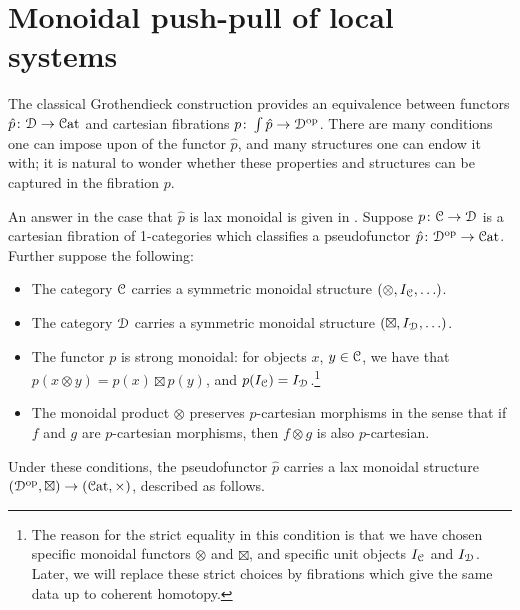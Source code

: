 \documentclass[main.tex]{subfiles}
\begin{document}
\section{Monoidal push-pull of local systems}
\label{sec:the_monoidal_construction}

The classical Grothendieck construction provides an equivalence between functors $\hat{p}\colon \mathcal{D} \to \mathcal{C}\mathrm{at}$ and cartesian fibrations $p\colon \int \hat{p} \to \mathcal{D}^{\mathrm{op}}$. There are many conditions one can impose upon of the functor $\hat{p}$, and many structures one can endow it with; it is natural to wonder whether these properties and structures can be captured in the fibration $p$.

An answer in the case that $\hat{p}$ is lax monoidal is given in \cite{moeller2018monoidal}. Suppose $p\colon \mathcal{C} \to \mathcal{D}$ is a cartesian fibration of 1-categories which classifies a pseudofunctor $\hat{p}\colon \mathcal{D}^{\mathrm{op}} \to \mathcal{C}\mathrm{at}$. Further suppose the following:
\begin{itemize}
  \item The category $\mathcal{C}$ carries a symmetric monoidal structure $(\otimes, I_{\mathcal{C}}, \ldots)$.

  \item The category $\mathcal{D}$ carries a symmetric monoidal structure $(\boxtimes, I_{\mathcal{D}}, \ldots)$.

  \item The functor $p$ is strong monoidal: for objects $x$, $y \in \mathcal{C}$, we have that $p(x \otimes y) = p(x) \boxtimes p(y)$, and $p(I_{\mathcal{C}}) = I_{\mathcal{D}}$.\footnote{The reason for the strict equality in this condition is that we have chosen specific monoidal functors $\otimes$ and $\boxtimes$, and specific unit objects $I_{\mathcal{C}}$ and $I_{\mathcal{D}}$. Later, we will replace these strict choices by fibrations which give the same data up to coherent homotopy.}

  \item The monoidal product $\otimes$ preserves $p$-cartesian morphisms in the sense that if $f$ and $g$ are $p$-cartesian morphisms, then $f \otimes g$ is also $p$-cartesian.
\end{itemize}
Under these conditions, the pseudofunctor $\hat{p}$ carries a lax monoidal structure $(\mathcal{D}^{\mathrm{op}}, \boxtimes) \to (\mathcal{C}\mathrm{at}, \times)$, described as follows. 
\end{document}
